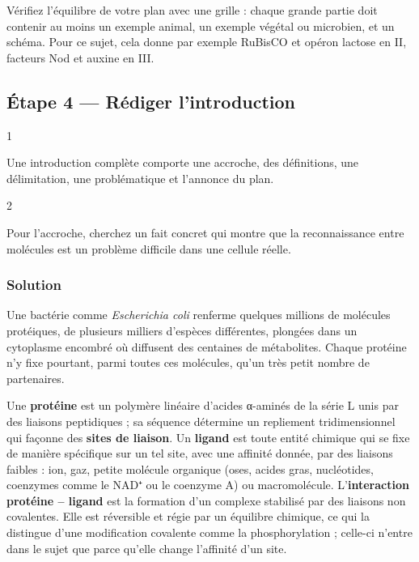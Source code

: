\documentclass[11pt,a4paper]{article}
\begin{document}
\begin{methode}

Vérifiez l'équilibre de votre plan avec une grille : chaque grande partie doit contenir au moins un exemple animal, un exemple végétal ou microbien, et un schéma. Pour ce sujet, cela donne par exemple RuBisCO et opéron lactose en II, facteurs Nod et auxine en III.

\end{methode}

\hypertarget{uxe9tape-4-ruxe9diger-lintroduction}{%
\subsection{Étape 4 --- Rédiger l'introduction}\label{uxe9tape-4-ruxe9diger-lintroduction}}

\begin{indication}{1}

Une introduction complète comporte une accroche, des définitions, une délimitation, une problématique et l'annonce du plan.

\end{indication}

\begin{indication}{2}

Pour l'accroche, cherchez un fait concret qui montre que la reconnaissance entre molécules est un problème difficile dans une cellule réelle.

\end{indication}

\hypertarget{solution-3}{%
\subsubsection{Solution}\label{solution-3}}

Une bactérie comme \emph{Escherichia coli} renferme quelques millions de molécules protéiques, de plusieurs milliers d'espèces différentes, plongées dans un cytoplasme encombré où diffusent des centaines de métabolites. Chaque protéine n'y fixe pourtant, parmi toutes ces molécules, qu'un très petit nombre de partenaires.

Une \textbf{protéine} est un polymère linéaire d'acides α-aminés de la série L unis par des liaisons peptidiques ; sa séquence détermine un repliement tridimensionnel qui façonne des \textbf{sites de liaison}. Un \textbf{ligand} est toute entité chimique qui se fixe de manière spécifique sur un tel site, avec une affinité donnée, par des liaisons faibles : ion, gaz, petite molécule organique (oses, acides gras, nucléotides, coenzymes comme le NAD⁺ ou le coenzyme A) ou macromolécule. L'\textbf{interaction protéine -- ligand} est la formation d'un complexe stabilisé par des liaisons non covalentes. Elle est réversible et régie par un équilibre chimique, ce qui la distingue d'une modification covalente comme la phosphorylation ; celle-ci n'entre dans le sujet que parce qu'elle change l'affinité d'un site.
\end{document}

